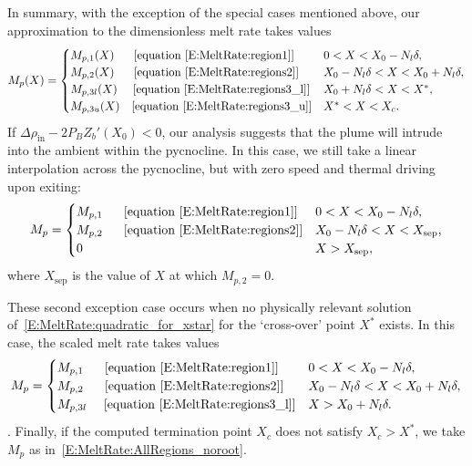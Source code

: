 \documentclass[openacc]{rsproca_new}%
\newcommand{\Pb}{\textit{P}_B}  %
\newcommand{\lt}{\delta} %
\renewcommand{\in}{\text{in}} %
\begin{document}
In summary, with the exception of the special cases mentioned above, our approximation to the dimensionless melt rate takes values
\begin{equation}\label{E:MeltRate:AllRegions}
M_{p}(X) = \begin{cases} 
M_{p,1}(X) \text{~~\quad [equation~\eqref{E:MeltRate:region1}]}  & 0 < X < X_0 - N_l \lt,\\
M_{p,2}(X) \text{~~\quad [equation~\eqref{E:MeltRate:regions2}]} & X_0 - N_l \lt < X < X_0 + N_l \lt,\\
M_{p,3l}(X) \text{~\quad [equation~\eqref{E:MeltRate:regions3_l}]} & X_0 + N_l \lt < X < X^*,\\
M_{p,3u}(X) \text{\quad [equation~\eqref{E:MeltRate:regions3_u}]} & X^* < X < X_c.
\end{cases}
\end{equation}
If $\Delta \rho_{\in} - 2 \Pb Z_b'(X_0) < 0$, our analysis suggests that the plume will intrude into the ambient within the pycnocline. In this case, we still take a linear interpolation across the pycnocline, but with zero speed and thermal driving upon exiting:
\begin{equation}
M_{p} = \begin{cases} 
M_{p,1~} \text{~\quad [equation~\eqref{E:MeltRate:region1}]}  & 0 < X < X_0 - N_l \lt,\\
M_{p,2~} \text{~\quad [equation~\eqref{E:MeltRate:regions2}]} & X_0 - N_l \lt < X <X_{\text{sep}} ,\\
0  &  X > X_{\text{sep}},\\
\end{cases}
\end{equation}
where $X_{\text{sep}}$ is the value of $X$ at which $M_{p,2} = 0$.

These second exception case occurs when no physically relevant solution of~\eqref{E:MeltRate:quadratic_for_xstar} for the `cross-over' point $X^*$ exists. In this case,  the scaled melt rate takes values
\begin{equation}\label{E:MeltRate:AllRegions_noroot}
M_{p} = \begin{cases} 
M_{p,1~} \text{~\quad [equation~\eqref{E:MeltRate:region1}]}  & 0 < X < X_0 - N_l \lt,\\
M_{p,2~} \text{~\quad [equation~\eqref{E:MeltRate:regions2}]} & X_0 - N_l \lt < X < X_0 + N_l \lt,\\
M_{p,3l~} \text{\quad [equation~\eqref{E:MeltRate:regions3_l}]} &  X > X_0 + N_l \lt.
\end{cases}
\end{equation}.
Finally, if the computed termination point $X_c$ does not satisfy $X_c > X^*$, we take $M_p$ as in~\eqref{E:MeltRate:AllRegions_noroot}.
\end{document}
